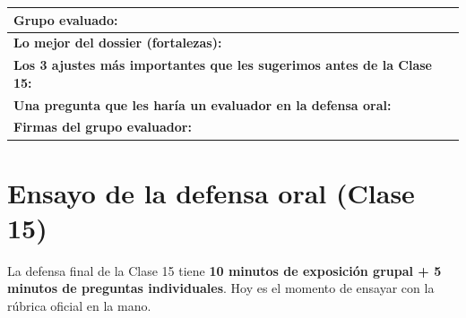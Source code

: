 \documentclass[12pt,a4paper]{article}
\renewcommand{\arraystretch}{1.25}
\begin{document}
\vspace{6pt}
\begin{cajaActividad}[title={Devoluci\'on cualitativa al grupo evaluado}]
\renewcommand{\arraystretch}{1.6}
\begin{tabularx}{\textwidth}{|X|}
\hline
\textbf{Grupo evaluado:} \hrulefill \\[4pt]
\hline
\textbf{Lo mejor del dossier (fortalezas):} \\[2.5cm]
\hline
\textbf{Los 3 ajustes m\'as importantes que les sugerimos antes de la Clase 15:} \\[4cm]
\hline
\textbf{Una pregunta que les har\'ia un evaluador en la defensa oral:} \\[2cm]
\hline
\textbf{Firmas del grupo evaluador:} \hrulefill \\[4pt]
\hline
\end{tabularx}
\end{cajaActividad}

\newpage
\section{Ensayo de la defensa oral (Clase 15)}

La defensa final de la Clase 15 tiene \textbf{10 minutos de exposici\'on grupal + 5 minutos de preguntas individuales}. Hoy es el momento de ensayar con la r\'ubrica oficial en la mano.
\end{document}
